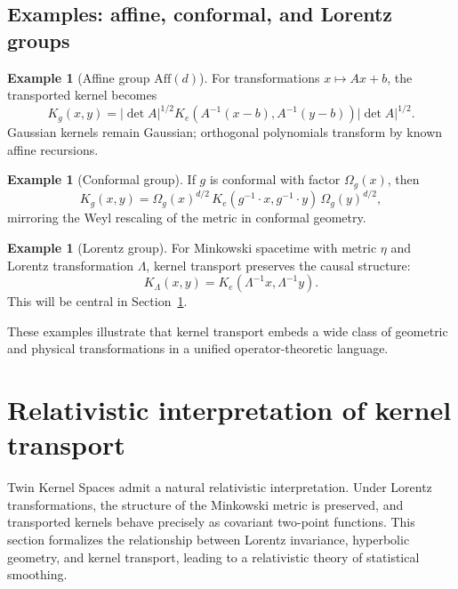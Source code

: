 \documentclass[11pt]{article}
\theoremstyle{definition}
\newtheorem{example}[theorem]{Example}
\begin{document}
\subsection{Examples: affine, conformal, and Lorentz groups}

\begin{example}[Affine group $\mathrm{Aff}(d)$]
	For transformations $x\mapsto Ax + b$,
	the transported kernel becomes
	\[
	K_g(x,y) = |\det A|^{1/2}
	K_e(A^{-1}(x-b), A^{-1}(y-b))
	|\det A|^{1/2}.
	\]
	Gaussian kernels remain Gaussian; orthogonal polynomials transform by known affine recursions.
\end{example}

\begin{example}[Conformal group]
	If $g$ is conformal with factor $\Omega_g(x)$, then
	\[
	K_g(x,y)
	= \Omega_g(x)^{d/2}\, K_e(g^{-1}\cdot x, g^{-1}\cdot y) \,\Omega_g(y)^{d/2},
	\]
	mirroring the Weyl rescaling of the metric in conformal geometry.
\end{example}

\begin{example}[Lorentz group]
	For Minkowski spacetime with metric $\eta$ and Lorentz transformation $\Lambda$,
	kernel transport preserves the causal structure:
	\[
	K_\Lambda(x,y)
	= K_e(\Lambda^{-1}x,\Lambda^{-1}y).
	\]
	This will be central in Section~\ref{sec:relativity}.
\end{example}

These examples illustrate that kernel transport embeds a wide class of geometric and physical transformations in a unified operator-theoretic language.


	
	\section{Relativistic interpretation of kernel transport}
	\label{sec:relativity}
	
	Twin Kernel Spaces admit a natural relativistic interpretation.
	Under Lorentz transformations, the structure of the Minkowski metric is preserved, and transported kernels behave precisely as covariant two-point functions.
	This section formalizes the relationship between Lorentz invariance, hyperbolic geometry, and kernel transport, leading to a relativistic theory of statistical smoothing.
	
\end{document}
